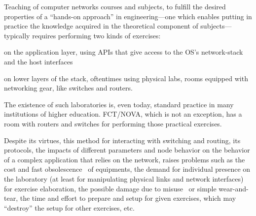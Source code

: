 Teaching of computer networks courses and subjects, to fulfill the desired properties of a ``hands-on approach'' in engineering---one which enables putting in practice the knowledge acquired in the theoretical component of subjects--- typically requires performing two kinds of exercises: %
  \begin{enumerate*}[label=(\roman*), itemjoin={{, }}, itemjoin*={{, and }}]
  \item on the application layer, using APIs that give access to the OS's network-stack and the host interfaces
  \item on lower layers of the stack, oftentimes using physical labs, rooms equipped with networking gear, like switches and routers.
  \end{enumerate*}
The existence of such laboratories is, even today, standard practice in many institutions of higher education.
FCT/NOVA, which is not an exception, has a room with routers and switches for performing those practical exercises.

Despite its virtues, this method for interacting with switching and routing, its protocols, the impacts of different parameters and node behavior on the behavior of a complex application that relies on the network, raises problems such as the cost and fast obsolescence~\cite{automaticnetconfiggns} of equipments, the demand for individual presence on the laboratory (at least for manipulating physical links and network interfaces) for exercise elaboration, the possible damage due to misuse~\cite{teachinginovation} or simple wear-and-tear, the time and effort to prepare and setup for given exercises, which may ``destroy'' the setup for other exercises, etc. %

